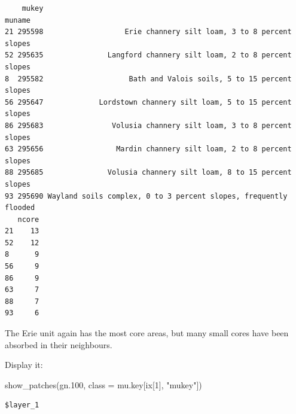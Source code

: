 \documentclass[
  letterpaper,
  DIV=11,
  numbers=noendperiod]{scrartcl}
\newenvironment{Shaded}{\begin{snugshade}}{\end{snugshade}}
\newcommand{\AttributeTok}[1]{\textcolor[rgb]{0.40,0.45,0.13}{#1}}
\newcommand{\DecValTok}[1]{\textcolor[rgb]{0.68,0.00,0.00}{#1}}
\newcommand{\FloatTok}[1]{\textcolor[rgb]{0.68,0.00,0.00}{#1}}
\newcommand{\FunctionTok}[1]{\textcolor[rgb]{0.28,0.35,0.67}{#1}}
\newcommand{\NormalTok}[1]{\textcolor[rgb]{0.00,0.23,0.31}{#1}}
\newcommand{\StringTok}[1]{\textcolor[rgb]{0.13,0.47,0.30}{#1}}
\begin{document}
\begin{verbatim}
    mukey                                                           muname
21 295598                   Erie channery silt loam, 3 to 8 percent slopes
52 295635               Langford channery silt loam, 2 to 8 percent slopes
8  295582                    Bath and Valois soils, 5 to 15 percent slopes
56 295647             Lordstown channery silt loam, 5 to 15 percent slopes
86 295683                Volusia channery silt loam, 3 to 8 percent slopes
63 295656                 Mardin channery silt loam, 2 to 8 percent slopes
88 295685               Volusia channery silt loam, 8 to 15 percent slopes
93 295690 Wayland soils complex, 0 to 3 percent slopes, frequently flooded
   ncore
21    13
52    12
8      9
56     9
86     9
63     7
88     7
93     6
\end{verbatim}

The Erie unit again has the most core areas, but many small cores have
been absorbed in their neighbours.

Display it:

\begin{Shaded}
\begin{Highlighting}[]
\FunctionTok{show\_patches}\NormalTok{(gn}\FloatTok{.100}\NormalTok{, }\AttributeTok{class =}\NormalTok{ mu.key[ix[}\DecValTok{1}\NormalTok{], }\StringTok{"mukey"}\NormalTok{])}
\end{Highlighting}
\end{Shaded}

\begin{verbatim}
$layer_1
\end{verbatim}
\end{document}
